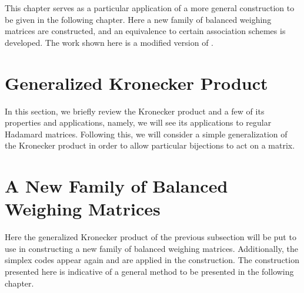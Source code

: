 \documentclass[../../main]{subfiles}
\begin{document}
This chapter serves as a particular application of a more general construction
to be given in the following chapter. Here a new family of balanced weighing
matrices are constructed, and an equivalence to certain association schemes is
developed. The work shown here is a modified version of \cite{new-bw}. 

\fancyhf{}

\fancyhead[RO,LE]{\thepage}

 \section{\centering Generalized Kronecker Product}
 
 In this section, we briefly review the Kronecker product and a few of its properties and applications, namely, we will see its applications to regular Hadamard matrices. Following this, we will consider a simple generalization of the Kronecker product in order to allow particular bijections to act on a matrix.
 
 \dinkus
 
 
 
 \fancyhf{}

 \fancyhead[RO,LE]{\thepage}

 \section{\centering A New Family of Balanced Weighing Matrices}
 
 Here the generalized Kronecker product of the previous subsection will be put to use in constructing a new family of balanced weighing matrices. Additionally, the simplex codes appear again and are applied in the construction. The construction presented here is indicative of a general method to be presented in the following chapter.
 
 \dinkus
 
 
 
 \fancyhf{}

 \fancyhead[RO,LE]{\thepage}
\end{document}
